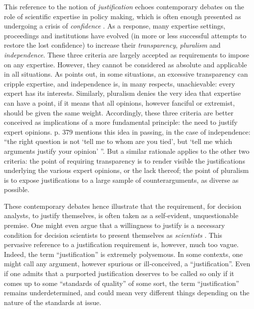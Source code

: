 \documentclass[preprint, french, english, 11pt, authoryear]{elsarticle}%
\begin{document}
This reference to the notion of \emph{justification} echoes contemporary debates on the role of scientific expertise in policy making, which is often enough presented as undergoing a crisis of \emph{confidence} \citep{godard_environnement_2015}. As a response, many expertise settings, proceedings and institutions have evolved (in more or less successful attempts to restore the lost confidence) to increase their \emph{transparency}, \emph{pluralism} and \emph{independence}. These three criteria are largely accepted as requirements to impose on any expertise. However, they cannot be considered as absolute and applicable in all situations. As \citet{godard_environnement_2015} points out, in some situations, an excessive transparency can cripple expertise, and independence is, in many respects, unachievable: every expert has its interests. Similarly, pluralism denies the very idea that expertise can have a point, if it means that all opinions, however fanciful or extremist, should be given the same weight. Accordingly, these three criteria are better conceived as implications of a more fundamental principle: the need to justify expert opinions. \citet{godard_environnement_2015} p. 379 mentions this idea in passing, in the case of independence: “the right question is not `tell me to whom are you tied', but `tell me which arguments justify your opinion' ”. But a similar rationale applies to the other two criteria: the point of requiring transparency is to render visible the justifications underlying the various expert opinions, or the lack thereof; the point of pluralism is to expose justifications to a large sample of counterarguments, as diverse as possible.

These contemporary debates hence illustrate that the requirement, for decision analysts, to justify themselves, is often taken as a self-evident, unquestionable premise. One might even argue that a willingness to justify is a necessary condition for decision scientists to present themselves as \emph{scientists} \citep{ormerod_justifying_2010}. This pervasive reference to a justification requirement is, however, much too vague. Indeed, the term ``justification'' is extremely polysemous. In some contexts, one might call any argument, however spurious or ill-conceived, a ``justification''. Even if one admits that a purported justification deserves to be called so only if it comes up to some ``standards of quality'' of some sort, the term ``justification'' remains underdetermined, and could mean very different things depending on the nature of the standards at issue.
\end{document}
